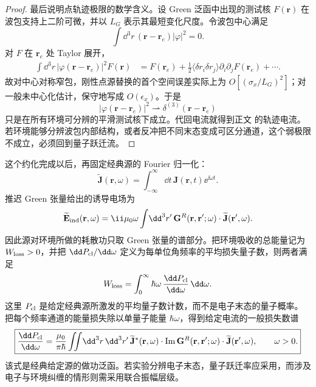 \begin{proof}
最后说明点轨迹极限的数学含义。设 Green 泛函中出现的测试核 $F(\mathbf r)$ 在波包支持上二阶可微，并以 $L_G$ 表示其最短变化尺度。令波包中心满足
\[
\int\dd^3r\,(\mathbf r-\mathbf r_e)|\varphi|^2=0.
\]
对 $F$ 在 $\mathbf r_e$ 处 Taylor 展开，
\begin{align*}
\int\dd^3r\,|\varphi(\mathbf r-\mathbf r_e)|^2F(\mathbf r)
&=F(\mathbf r_e)
+\frac12\langle\delta r_i\delta r_j\rangle
\partial_i\partial_jF(\mathbf r_e)+\cdots .
\end{align*}
故对中心对称窄包，刚性点源替换的首个空间误差实际上为 $O[(\sigma_x/L_G)^2]$；对一般未中心化估计，保守地写成 $O(\epsilon_x)$。于是
\[
|\varphi(\mathbf r-\mathbf r_e)|^2
\rightharpoonup
\delta^{(3)}(\mathbf r-\mathbf r_e)
\]
只是在所有环境可分辨的平滑测试核下成立。代回电流就得到正文 的轨迹电流。若环境能够分辨波包内部结构，或者反冲把不同末态变成可区分通道，这个弱极限不成立，必须回到量子跃迁流。
\end{proof}


这个约化完成以后，再固定经典源的 Fourier 归一化：
\begin{equation*}
\widetilde{\mathbf J}(\mathbf r,\omega)
=\int_{-\infty}^{\infty}\!\dd t\,
\mathbf J(\mathbf r,t)\ee^{\ii\omega t}.
\end{equation*}
推迟 Green 张量给出的诱导电场为
\begin{equation*}
\widetilde{\mathbf E}_{\rm ind}(\mathbf r,\omega)
=\ii\mu_0\omega\int\!\dd^3 r'\,
\mathbf G^R(\mathbf r,\mathbf r';\omega)\cdot\widetilde{\mathbf J}(\mathbf r',\omega).
\end{equation*}
因此源对环境所做的耗散功只取 Green 张量的谱部分。把环境吸收的总能量记为 $W_{\rm loss}>0$，并把 $\dd P_{\rm cl}/\dd\omega$ 定义为每单位角频率的平均损失量子数，则两者满足
\begin{equation*}
W_{\rm loss}
=\int_0^\infty\hbar\omega\,
\frac{\dd P_{\rm cl}}{\dd\omega}\,\dd\omega.
\end{equation*}
这里 $P_{\rm cl}$ 是给定经典源所激发的平均量子数计数，而不是电子末态的量子概率。把每个频率通道的能量损失除以单量子能量 $\hbar\omega$，得到给定电流的一般损失数谱
\begin{equation}
\boxed{
\frac{\dd P_{\rm cl}}{\dd\omega}
=\frac{\mu_0}{\pi\hbar}
\iint\!\dd^3 r\,\dd^3 r'\,
\widetilde{\mathbf J}^{*}(\mathbf r,\omega)\cdot
\operatorname{Im}\mathbf G^R(\mathbf r,\mathbf r';\omega)\cdot
\widetilde{\mathbf J}(\mathbf r',\omega),
\qquad \omega>0.}
\label{eq:prescribed_current_green_loss_master}
\end{equation}
该式是经典给定源的做功泛函。若实验分辨电子末态，量子跃迁率应采用，而涉及电子与环境纠缠的情形则需采用联合振幅层级。

